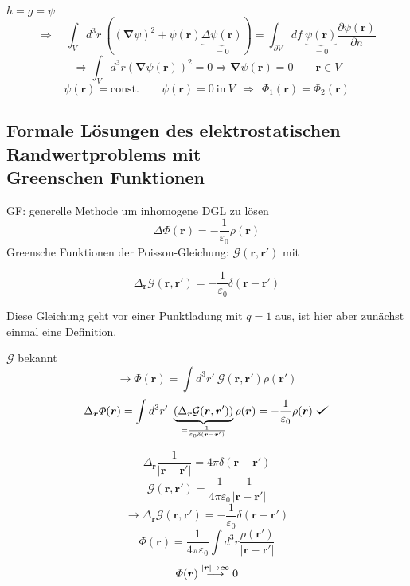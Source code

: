 \documentclass[titlepage,11pt,a4paper,ngerman]{report}
\def\checkmark{\tikz\fill[scale=0.4](0,.35) -- (.25,0) -- (1,.7) -- (.25,.15) -- cycle;}
\newcommand{\tx}[1]{\textrm{#1}}
\newcommand{\const}{\tx{const.}}
\newcommand{\gre}{\mathcal{G}}
\newcommand{\pofr}{\Phi(\vec{r})}
\renewcommand{\Phi}{\varPhi}
\renewcommand{\vec}[1]{\boldsymbol{#1}}
\newcommand{\lcom}[1]{\color{MidnightBlue}#1\color{black}}
\renewcommand{\epsilon}{\varepsilon}
\newcommand{\vabla}{\boldsymbol{\nabla}}
\newcommand{\frbox}[2]{\begin{tcolorbox}[colback=white,colframe=red!75!black,fonttitle=\bfseries,title=#1]#2\end{tcolorbox}}
\begin{document}
$h = g = \psi$
$$\Rightarrow \quad \int_V d^3 r\ ((\vabla \psi)^2 + \psi(\vec{r}) \underbrace{\Delta \psi(\vec{r})}_{=0}) = \int_{\partial V} df\ \underbrace{\psi(\vec{r})}_{=0} \frac{\partial \psi(\vec{r})}{\partial n} $$
\begin{equation*}
\Rightarrow \int_V d^3 r \left(\vec{\nabla} \psi(\vec{r}) \right)^2 = 0 \Rightarrow \vec{\nabla} \psi(\vec{r}) = 0 \qquad \vec{r} \in V
\end{equation*}
\begin{equation*}
\psi(\vec{r}) = \const \qquad \psi(\vec{r}) = 0 \ \tx{in} \ V \ \ \Rightarrow \ \ \Phi_1(\vec{r}) = \Phi_2(\vec{r})
\end{equation*}

\subsection{Formale Lösungen des elektrostatischen Randwertproblems mit \\ Greenschen Funktionen}
GF: generelle Methode um inhomogene DGL zu lösen
\begin{equation*}
\Delta \pofr = - \frac{1}{\epsilon_0} \rho(\vec{r})
\end{equation*}
Greensche Funktionen der Poisson-Gleichung: $ \gre(\vec{r},\vec{r}') $ mit
\frbox{Greensche Funktionen der Poisson-Gleichung}{\begin{equation*}
\Delta_{\vec{r}} \gre(\vec{r},\vec{r}') = - \frac{1}{\epsilon_0} \delta(\vec{r} - \vec{r}')
\end{equation*}}
\lcom{Diese Gleichung geht vor einer Punktladung mit $ q=1 $ aus, ist hier aber zunächst einmal eine Definition.}

$\mathcal G$ bekannt 
$$\rightarrow \pofr = \int d^3 r'\ \mathcal G(\vec{r}, \vec{r}') \rho(\vec{r}')$$
$$\Delta_{\vec{r}} \pofr = \int d^3 r'\ \underbrace{(\Delta_{\vec{r}} \mathcal G(\vec{r}, \vec{r}'))}_{= \frac{1}{\epsilon_0 \delta(\vec{r}-\vec{r}')}} \rho (\vec{r}) = - \frac{1}{\epsilon_0} \rho (\vec{r})\ \checkmark$$

\begin{equation*}
\Delta_{\vec{r}} \frac{1}{|\vec{r} - \vec{r}'|} = 4 \pi \delta(\vec{r} - \vec{r}')
\end{equation*}
\begin{equation*}
\gre(\vec{r},\vec{r}') = \frac{1}{4 \pi \epsilon_0} \frac{1}{|\vec{r} - \vec{r}'|}
\end{equation*}
\begin{equation*}
\rightarrow \Delta_{\vec{r}} \gre(\vec{r}, \vec{r}') = - \frac{1}{\epsilon_0} \delta(\vec{r} - \vec{r}')
\end{equation*}
\begin{equation*}
\pofr = \frac{1}{4 \pi \epsilon_0} \int d^3 r \frac{\rho(\vec{r}')}{|\vec{r} - \vec{r}'|}
\end{equation*}
\begin{equation*}
\pofr \buildrel |\vec{r}| \to \infty \over \longrightarrow 0
\end{equation*}
\end{document}

